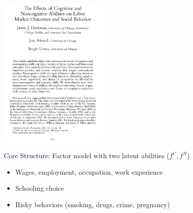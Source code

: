 \documentclass[aspectratio=169]{beamer}
\begin{document}
\begin{frame}
\centering
\includegraphics[width=0.4\textwidth]{Heckman_Stixrud_Urzua_2006_JOLE_cover.jpg}
\end{frame}

\begin{frame}

\textcolor{navy}{Core Structure:} Factor model with two latent abilities ($f^C, f^N$)

\bigskip


\bigskip


\end{frame}

\begin{frame}


\begin{itemize}
\itemsep1.5em
\item<2-> Wages, employment, occupation, work experience
\item<3-> Schooling choice
\item<4-> Risky behaviors (smoking, drugs, crime, pregnancy)
\end{itemize}

\end{frame}
\end{document}
